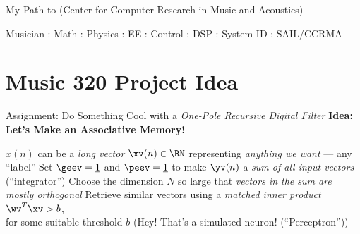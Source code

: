 \begin{slide}[\slideopts,toc={Path to CCRMA}]{My Path to
    (Center for Computer Research in Music and Acoustics)
}

\centerline{Musician : Math : Physics : EE : Control : DSP : System ID : SAIL/CCRMA}
\vspace{1em}

\end{slide}



%

%

\section[\sectopts,toc={Basic Idea}]{Music 320 Project Idea}

\begin{slide}[\slideopts,toc={One Pole Filter}]{Assignment: Do Something Cool with a \emph{One-Pole Recursive Digital Filter}}
\vspace{-1em}
\maybepause
\vspace{-1em}
\textbf{Idea: Let's Make an Associative Memory!}
\begin{itemize}
\mpitem $x(n)$ can be a \emph{long vector} $\xv(n)\in\RN$ representing \emph{anything we want} --- any ``label''
\mpitem Set $\geev = \underline{1}$ and $\peev = \underline{1}$ to make $\yv(n)$ a \emph{sum of all input vectors} (``integrator'')
\mpitem Choose the dimension $N$ so large that \emph{vectors in the sum are mostly orthogonal}
\mpitem Retrieve similar vectors using a \emph{matched inner product} $\wv^T\xv > b$,\\
        for some suitable threshold $b$ (Hey! That's a simulated neuron! (``Perceptron''))
\end{itemize}
\end{slide}

